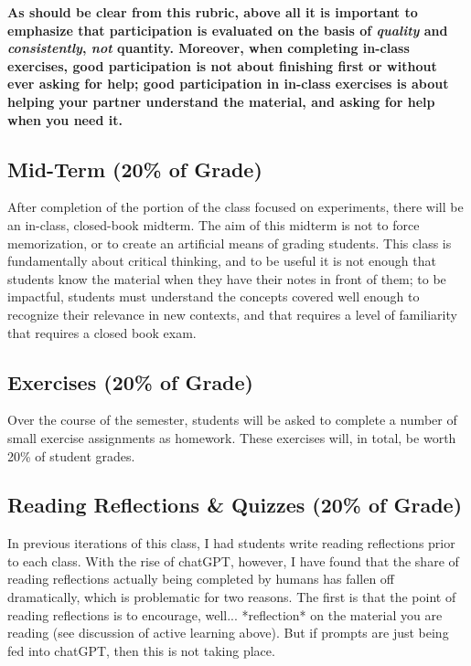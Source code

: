 \documentclass[12pt]{article}
\begin{document}
\textbf{As should be clear from this rubric, above all it is important to emphasize that participation is evaluated on the basis of \emph{quality} and \emph{consistently}, \emph{not} quantity. Moreover, when completing in-class exercises, good participation is not about finishing first or without ever asking for help; good participation in in-class exercises is about helping your partner understand the material, and asking for help when you need it.}

\subsection{Mid-Term (20\% of Grade)}

After completion of the portion of the class focused on experiments, there will be an in-class, closed-book midterm. The aim of this midterm is not to force memorization, or to create an artificial means of grading students. This class is fundamentally about critical thinking, and to be useful it is not enough that students know the material when they have their notes in front of them; to be impactful, students must understand the concepts covered well enough to recognize their relevance in new contexts, and that requires a level of familiarity that requires a closed book exam.

\subsection{Exercises (20\% of Grade)}

Over the course of the semester, students will be asked to complete a number of small exercise assignments as homework. These exercises will, in total, be worth 20\% of student grades.

\subsection{Reading Reflections \& Quizzes (20\% of Grade)}

In previous iterations of this class, I had students write reading reflections prior to each class. With the rise of chatGPT, however, I have found that the share of reading reflections actually being completed by humans has fallen off dramatically, which is problematic for two reasons. The first is that the point of reading reflections is to encourage, well... *reflection* on the material you are reading (see discussion of active learning above). But if prompts are just being fed into chatGPT, then this is not taking place.
\end{document}

